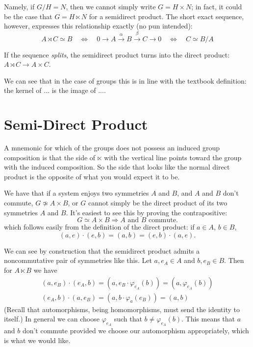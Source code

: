 \documentclass{report}
\begin{document}
Namely, if $ G/H = N $, then we cannot simply write $ G = H\times N $; in fact, 
it could be the case that $ G = H\ltimes N$ for a semidirect product. The 
short exact sequence, however, expresses this relationship exactly (no pun intended): 
\begin{equation*}
	A \rtimes C \simeq B
	\quad \iff\quad 
	0 \longrightarrow A \xrightarrow{\;\alpha\;}
	B \xrightarrow{\; \beta \;} C \longrightarrow 0
	\quad \iff \quad
	C \simeq B/A
\end{equation*}

If the sequence \textit{splits}, the semidirect product turns into the direct
product: $ A \rtimes C \rightarrow A \times C $. 

We can see that in the case of groups this is in line with the textbook definition: 
the kernel of ... is the image of ....


\section{Semi-Direct Product}
A mnemonic for which of the groups does not possess an induced group composition 
is that the side of $ \ltimes $ with the vertical line points toward the group 
with the induced composition. So the side that looks like the normal direct product 
is the opposite of what you would expect it to be. 

We have that if a system enjoys two symmetries $ A $ and $ B $, and $ A $ 
and $ B $ don't commute, $ G\not\simeq A\times B$, or $ G $ cannot simply be the 
direct product of its two symmetries $ A $ and $ B $. It's easiest to see this 
by proving the contrapositive: 
\begin{equation*}
	G \simeq A \times B \Longrightarrow A \text{ and } B \text{ commute}.
\end{equation*}
which follows easily from the definition of the direct product: if $ a\in A $, 
$ b\in B$, 
\begin{equation*}
	(a, e) \cdot (e, b) = (a, b) = (e, b) \cdot (a, e).
\end{equation*}

We can see by construction that the semidirect product admits a noncommutative 
pair of symmetries like this. Let $ a, e_A\in A $ and $ b, e_B \in B $. Then
for $ A \ltimes B $	we have 
\begin{gather*}
	(a, e_B)\cdot(e_A, b) 
		= (a, e_B \cdot \varphi_{e_A} (b)) = (a, \varphi_{e_A}(b))\\ 
	(e_A, b)\cdot(a, e_B)
		= (a, b\cdot \varphi_a(e_B))
		= (a,b)
\end{gather*}
(Recall that automorphisms, being homomorphisms, must send the identity to itself.)
In general we can choose $ \varphi_{e_A} $ such that $ b\neq \varphi_{e_A} (b)
$. This means that $ a $ and $ b $ don't commute provided we choose our
automorphism appropriately, which is what we would like. 
\end{document}
